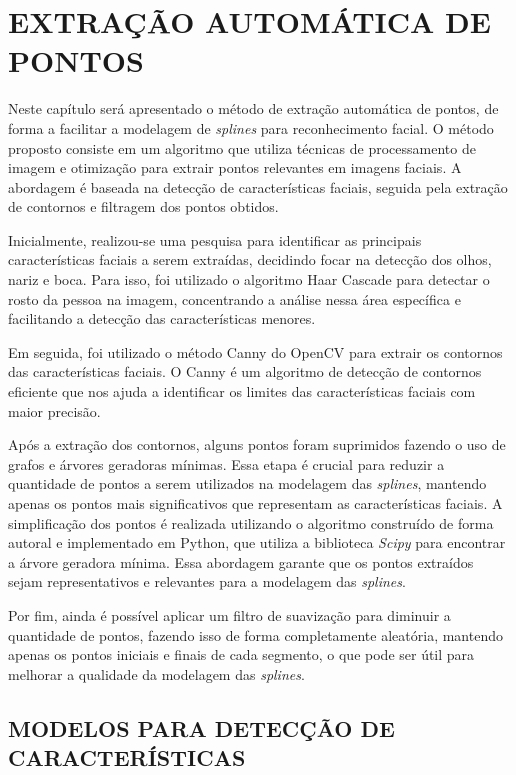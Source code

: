 \chapter{EXTRAÇÃO AUTOMÁTICA DE PONTOS} \label{cha:processamento-imagem} 

Neste capítulo será apresentado o método de extração automática de pontos, de forma a facilitar a modelagem de \textit{splines} para reconhecimento facial. O método proposto consiste em um algoritmo que utiliza técnicas de processamento de imagem e otimização para extrair pontos relevantes em imagens faciais. A abordagem é baseada na detecção de características faciais, seguida pela extração de contornos e filtragem dos pontos obtidos.

Inicialmente, realizou-se uma pesquisa para identificar as principais características faciais a serem extraídas, decidindo focar na detecção dos olhos, nariz e boca. Para isso, foi utilizado o algoritmo Haar Cascade \cite{BoostedCascade} para detectar o rosto da pessoa na imagem, concentrando a análise nessa área específica e facilitando a detecção das características menores.

Em seguida, foi utilizado o método Canny do OpenCV \cite{CannyAplicacao, Canny} para extrair os contornos das características faciais. O Canny é um algoritmo de detecção de contornos eficiente que nos ajuda a identificar os limites das características faciais com maior precisão.

Após a extração dos contornos, alguns pontos foram suprimidos fazendo o uso de grafos e árvores geradoras mínimas. Essa etapa é crucial para reduzir a quantidade de pontos a serem utilizados na modelagem das \textit{splines}, mantendo apenas os pontos mais significativos que representam as características faciais. A simplificação dos pontos é realizada utilizando o algoritmo construído de forma autoral e implementado em Python, que utiliza a biblioteca \textit{Scipy} \cite{Scipy} para encontrar a árvore geradora mínima. Essa abordagem garante que os pontos extraídos sejam representativos e relevantes para a modelagem das \textit{splines}.

Por fim, ainda é possível aplicar um filtro de suavização para diminuir a quantidade de pontos, fazendo isso de forma completamente aleatória, mantendo apenas os pontos iniciais e finais de cada segmento, o que pode ser útil para melhorar a qualidade da modelagem das \textit{splines}.

\section{MODELOS PARA DETECÇÃO DE CARACTERÍSTICAS}

